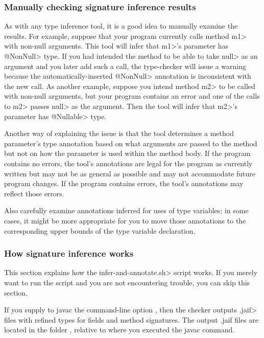 \subsubsection{Manually checking signature inference results\label{signature-inference-manual-checking}}

As with any type inference tool, it is a good idea to manually examine the
results.
For example, suppose that your program currently calls
method \<m1> with non-null
arguments.  This tool will infer that \<m1>'s parameter has
\<@NonNull> type.  If you had intended the method to be able to
take \<null> as an argument and you later add such a call, the type-checker
will issue a warning because the automatically-inserted \<@NonNull>
annotation is inconsistent with the new call.
As another example, suppose you intend method \<m2> to be called with
non-null arguments, but your program contains an error and one of the calls
to \<m2> passes \<null> as the argument.  Then the tool will infer that
\<m2>'s parameter has \<@Nullable> type.

Another way of explaining the issue is that the tool determines a method parameter's type
annotation based on what arguments are passed to the method but not on how the
parameter is used within the method body.  If the program contains
no errors, the tool's annotations are legal for the program as
currently written but may not be as general as possible and may not
accommodate future program changes.  If the program contains errors, the
tool's annotations may reflect those errors.

Also carefully examine annotations inferred for uses of type variables; in
some cases, it might be more appropriate for you to move those annotations
to the corresponding upper bounds of the type variable declaration.


\subsubsection{How signature inference works\label{how-signature-inference-works}}

This section explains how the \<infer-and-annotate.sh> script works.  If you
merely want to run the script and you are not encountering trouble, you can
skip this section.

If you
supply to javac the command-line option , then the
checker outputs \<.jaif> files with refined types for fields and method signatures.
The output .jaif files are located in the folder ,
relative to where you executed the javac command.

